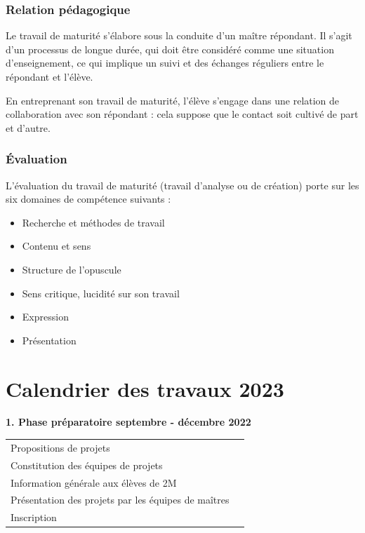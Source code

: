 \documentclass[
  10pt,
  french,
  a5paper,
  openany]{book}
\providecommand{\tightlist}{%
  \setlength{\itemsep}{0pt}\setlength{\parskip}{0pt}}
\begin{document}
\hypertarget{relation-puxe9dagogique}{%
\subsection*{Relation pédagogique}\label{relation-puxe9dagogique}}

Le travail de maturité s'élabore sous la conduite d'un maître répondant. Il s'agit d'un processus de longue durée, qui doit être considéré comme une situation d'enseignement, ce qui implique un suivi et des échanges réguliers entre le répondant et l'élève.

En entreprenant son travail de maturité, l'élève s'engage dans une relation de collaboration avec son répondant : cela suppose que le contact soit cultivé de part et d'autre.

\hypertarget{uxe9valuation-1}{%
\subsection*{Évaluation}\label{uxe9valuation-1}}

L'évaluation du travail de maturité (travail d'analyse ou de création) porte sur les six domaines de compétence suivants :

\begin{itemize}
\tightlist
\item
  Recherche et méthodes de travail
\item
  Contenu et sens
\item
  Structure de l'opuscule
\item
  Sens critique, lucidité sur son travail
\item
  Expression
\item
  Présentation
\end{itemize}

\hypertarget{calendrier-des-travaux-2023}{%
\chapter*{Calendrier des travaux 2023}\label{calendrier-des-travaux-2023}}


\textbf{1. Phase préparatoire \hfill septembre - décembre 2022}

\begin{longtable}[]{@{}ll@{}}
\toprule
\endhead
Propositions de projets &\tabularnewline
Constitution des équipes de projets &\tabularnewline
Information générale aux élèves de 2M &\tabularnewline
Présentation des projets par les équipes de maîtres &\tabularnewline
Inscription &\tabularnewline
\bottomrule
\end{longtable}
\end{document}
